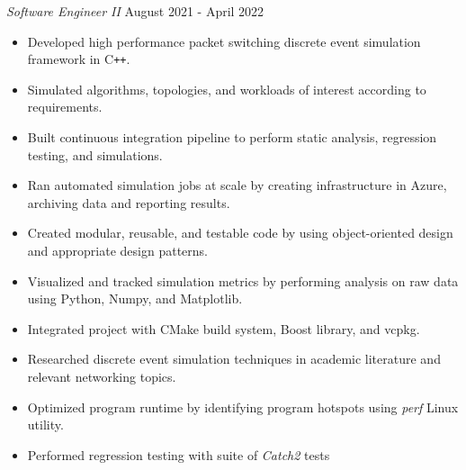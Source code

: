 \documentclass[overlapped]{res}
\begin{document}
\begin{resume}
{\sl Software Engineer II} \hfill August 2021 - April 2022
\begin{itemize}  \itemsep -2pt %
    \item Developed high performance packet switching discrete event simulation framework in C\texttt{++}.
    \item Simulated algorithms, topologies, and workloads of interest according to requirements.
    \item Built continuous integration pipeline to perform static analysis, regression testing, and simulations.
    \item Ran automated simulation jobs at scale by creating infrastructure in Azure, archiving data and reporting results.
    \item Created modular, reusable, and testable code by using object-oriented design and appropriate design patterns.
    \item Visualized and tracked simulation metrics by performing analysis on raw data using Python, Numpy, and Matplotlib.
    \item Integrated project with CMake build system, Boost library, and vcpkg.
    \item Researched discrete event simulation techniques in academic literature and relevant networking topics.
    \item Optimized program runtime by identifying program hotspots using {\it perf} Linux utility.
    \item Performed regression testing with suite of {\it Catch2} tests
\end{itemize}



\end{resume}
\end{document}
